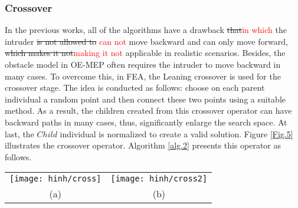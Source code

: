 \documentclass[final]{elsarticle}
\begin{document}
\subsubsection{Crossover}

In the previous works, all of the algorithms have a drawback \sout{that}\textcolor{red}{in which} the intruder \sout{is not allowed to} \textcolor{red}{can not} move backward and can only move forward, \sout{which makes it not}\textcolor{red}{making it not} applicable in realistic scenarios. Besides, the obstacle model in OE-MEP often requires the intruder to move backward in many cases. To overcome this, in FEA, the Leaning crossover is used for the crossover stage. The idea is conducted as follows: choose on each parent individual a random point and then connect these two points using a suitable method. As a result, the children created from this crossover operator can have backward paths in many cases, thus, significantly enlarge the search space. At last, the $Child$ individual is normalized to create a valid solution. Figure \ref{Fig.5} illustrates the crossover operator. Algorithm \ref{alg.2} presents this operator as follows.

\begin{algorithm}[H]
	\SetAlgoLined
	\caption{\textbf{Crossover Operator}} 
	\label{alg.2}
\end{algorithm} 
\begin{figure*}[h]
	\begin{tabular}{cc}
		\texttt{[image: hinh/cross]}&\texttt{[image: hinh/cross2]}\\
		(a) & (b)\\
	\end{tabular}
	\centering
	\caption{Illustration of Leaning crossover operator
	}
	\label{Fig.5}       %
\end{figure*}
\end{document}
